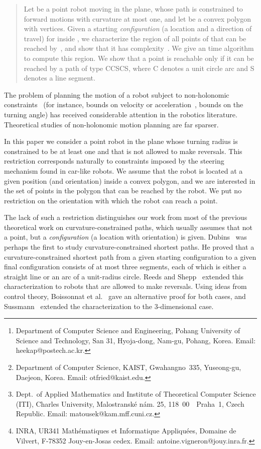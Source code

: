 \documentclass[a4paper]{article}
\author{Hee-Kap Ahn\thanks{Department of Computer
    Science and Engineering, Pohang University of Science and Technology,
    San 31, Hyoja-dong, Nam-gu, Pohang, Korea. Email: heekap@postech.ac.kr.}
  \and
  Otfried Cheong\thanks{Department of Computer Science, KAIST, Gwahangno~335,
    Yuseong-gu, Daejeon, Korea. Email: otfried@kaist.edu.}
  \and 
  Ji\v{r}\'{\i} Matou\v{s}ek\thanks{Dept.~of Applied Mathematics and Institute of Theoretical
    Computer Science (ITI), Charles University,
    Malostransk\'{e} n\'{a}m. 25, 118~00~~Praha~1, Czech Republic.
  Email: matousek@kam.mff.cuni.cz.}  
  \and 
  Antoine Vigneron\thanks{INRA, UR341 Math\'ematiques et Informatique Appliqu\'ees, 
  Domaine de Vilvert, F-78352 Jouy-en-Josas cedex. 
  Email: antoine.vigneron@jouy.inra.fr.}}
\makeatletter
\def\section{\@startsection {section}{1}{\z@}{-3.5ex plus -1ex minus
-.2ex}{2.3ex plus .2ex}{\large\bf}}
\makeatother
\begin{document}
\maketitle

\begin{abstract}
  Let  be a point robot moving in the plane, whose path is
  constrained to forward motions with curvature at most one, and let
   be a convex polygon with  vertices.  Given a starting
  \emph{configuration} (a location and a direction of travel) for 
  inside , we characterize the region of all points of  that can
  be reached by~, and show that it has complexity~.  We give
  an  time algorithm to compute this region.  We show that a
  point is reachable only if it can be reached by a path of type
  CCSCS, where C denotes a unit circle arc and S denotes a line
  segment.
\end{abstract}

\section{Introduction}

The problem of planning the motion of a robot subject to non-holonomic
constraints~\cite{l-rmp-91, ss-ampr-90} (for instance, bounds on
velocity or acceleration~\cite{crr-eakpp-91, dxcr-kmp-93,
  rs-mppmo-94}, bounds on the turning angle) has received
considerable attention in the robotics literature.  Theoretical
studies of non-holonomic motion planning are far sparser.

In this paper we consider a point robot in the plane whose turning
radius is constrained to be at least one and that is not allowed to
make reversals.  This restriction corresponds naturally to constraints
imposed by the steering mechanism found in car-like robots.  We assume
that the robot is located at a given position (and orientation) inside
a convex polygon, and we are interested in the set of points in the
polygon that can be reached by the robot.  We put no restriction on
the orientation with which the robot can reach a point.

The lack of such a restriction distinguishes our work from most of the
previous theoretical work on curvature-constrained paths, which
usually assumes that not a point, but a \emph{configuration} (a
location with orientation) is given.  Dubins~\cite{d-cmlca-57} was
perhaps the first to study curvature-constrained shortest paths.  He
proved that a curvature-constrained shortest path from a given
starting configuration to a given final configuration consists of at
most three segments, each of which is either a straight line or an arc of
a unit-radius circle.  Reeds and Shepp~\cite{rs-opctg-90} extended
this characterization to robots that are allowed to make reversals.
Using ideas from control theory, Boissonnat et al.~\cite{bcl-spbcp-94}
gave an alternative proof for both cases, and Sussmann~\cite{s-sppcb-95}
extended the characterization to the 3-dimensional case.  
\end{document}
